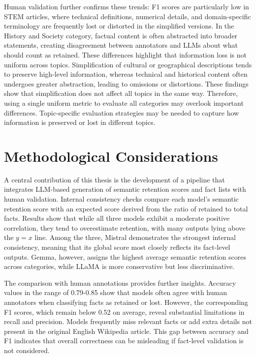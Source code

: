 \documentclass{DESSThesis}
\begin{document}
Human validation further confirms these trends: F1 scores are particularly low in STEM articles, where technical definitions, numerical details, and domain-specific terminology are frequently lost or distorted in the simplified versions. In the History and Society category, factual content is often abstracted into broader statements, creating disagreement between annotators and LLMs about what should count as retained. These differences highlight that information loss is not uniform across topics. Simplification of cultural or geographical descriptions tends to preserve high-level information, whereas technical and historical content often undergoes greater abstraction, leading to omissions or distortions. These findings show that simplification does not affect all topics in the same way. Therefore, using a single uniform metric to evaluate all categories may overlook important differences. Topic-specific evaluation strategies may be needed to capture how information is preserved or lost in different topics.

\section{Methodological Considerations}
A central contribution of this thesis is the development of a pipeline that integrates LLM-based generation of semantic retention scores and fact lists with human validation. Internal consistency checks compare each model’s semantic retention score with an expected score derived from the ratio of retained to total facts. Results show that while all three models exhibit a moderate positive correlation, they tend to overestimate retention, with many outputs lying above the $y=x$ line. Among the three, Mistral demonstrates the strongest internal consistency, meaning that its global score most closely reflects its fact-level outputs. Gemma, however, assigns the highest average semantic retention scores across categories, while LLaMA is more conservative but less discriminative.

The comparison with human annotations provides further insights. Accuracy values in the range of 0.79-0.85 show that models often agree with human annotators when classifying facts as retained or lost. However, the corresponding F1 scores, which remain below 0.52 on average, reveal substantial limitations in recall and precision. Models frequently miss relevant facts or add extra details not present in the original English Wikipedia article. This gap between accuracy and F1 indicates that overall correctness can be misleading if fact-level validation is not considered.
\end{document}
